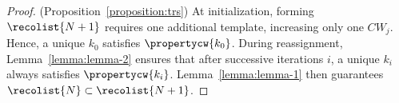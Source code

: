 \begin{proof} (Proposition~\ref{proposition:trs})
At initialization, forming $\recolist{N+1}$ requires one additional template, increasing only one $CW_j$. Hence, a unique $k_0$ satisfies $\propertycw{k_0}$. During reassignment, Lemma~\ref{lemma:lemma-2} ensures that after successive iterations $i$, a unique $k_i$ always satisfies $\propertycw{k_i}$. Lemma~\ref{lemma:lemma-1} then guarantees $\recolist{N} \subset \recolist{N+1}$.
\end{proof}



